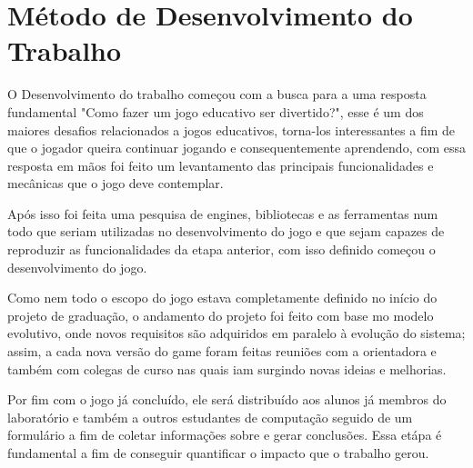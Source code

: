 


\section{Método de Desenvolvimento do Trabalho}
\label{sec-intro-met}
O Desenvolvimento do trabalho começou com a busca para a uma resposta fundamental "Como fazer um jogo educativo ser divertido?", esse é um dos maiores desafios relacionados a jogos educativos, torna-los interessantes a fim de que o jogador queira continuar jogando e consequentemente aprendendo, com essa resposta em mãos foi feito um levantamento das principais funcionalidades e mecânicas que o jogo deve contemplar.

    Após isso foi feita uma pesquisa de engines, bibliotecas e as ferramentas num todo que seriam utilizadas no desenvolvimento do jogo e que sejam capazes de reproduzir as funcionalidades da etapa anterior,
    com isso definido começou o desenvolvimento do jogo.

Como nem todo o escopo do jogo estava completamente definido no início do projeto de graduação, o andamento do projeto foi feito com base mo modelo evolutivo, onde novos requisitos são adquiridos em paralelo à evolução do sistema; assim, a cada nova versão do game foram feitas reuniões com a orientadora e também com colegas de curso nas quais iam surgindo novas ideias e melhorias.

Por fim com o jogo já concluído, ele será distribuído aos alunos já membros do laboratório e também a outros estudantes de computação seguido de um formulário a fim de coletar informações sobre e gerar conclusões. Essa etápa é fundamental a fim de conseguir quantificar o impacto que o trabalho gerou.





